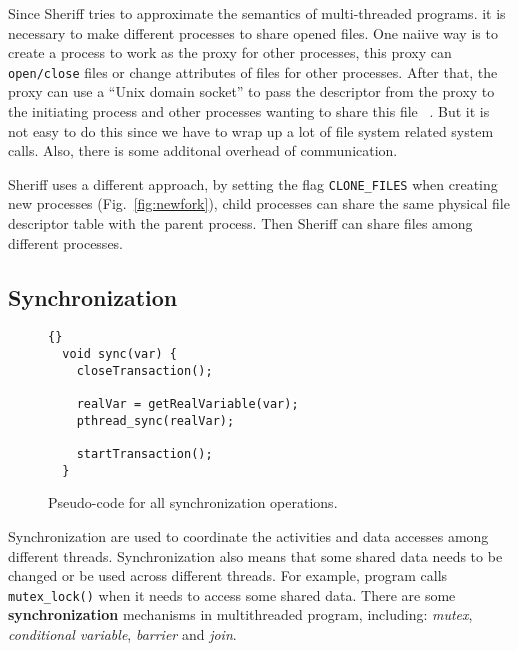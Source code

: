 Since Sheriff tries to approximate the semantics of multi-threaded programs.
it is necessary to make different processes to share opened files.
One naiive way is to create a process to work as the proxy for other processes, this proxy can \texttt{open/close} files 
or change attributes of files for other processes. 
After that, the proxy can use a ``Unix domain socket'' to pass the descriptor from the proxy to the initiating process 
and other processes wanting to share this file ~\cite{passfd}. 
But it is not easy to do this since we have to wrap up a lot of file system related system calls. 
Also, there is some additonal overhead of communication.

Sheriff uses a different approach, by setting the flag \texttt{CLONE\_FILES} 
when creating new processes (Fig.~\ref{fig:newfork}), 
child processes can share the same physical file descriptor table with the parent process. 
Then Sheriff can share files among different processes.
\begin{comment}
It is noted that using \texttt{clone()} to create new process will affect the getpid() system call.
Although current thread model is the 1-to-1 model in pthreads library (not n-to-1 model any more), 
glibc's wrapper will always return the process ID of the parent process via the glibc wrapper function. 
Sheriff avoid this predicament by intercept getpid() calls then just give the stored pid for different threads.
\end{comment}

\subsection{Synchronization}
\label{simulation:syn}

\begin{figure}[!t]
\small
\begin{lstlisting}[frame=trbl]{}
  void sync(var) {
    closeTransaction();

	realVar = getRealVariable(var);
	pthread_sync(realVar);
	
    startTransaction();
  }
\end{lstlisting}
\caption{Pseudo-code for all synchronization operations.\label{fig:synccode}}
\end{figure}
Synchronization are used to coordinate the activities and data accesses among different threads. 
Synchronization also means that some shared data needs to be changed or be used across different threads. 
For example, program calls \texttt{mutex\_lock()} when it needs to access some shared data. 
There are some \textbf{synchronization} mechanisms in multithreaded program, 
including: \textit{mutex}, \textit{conditional variable}, \textit{barrier} and \textit{join}.

